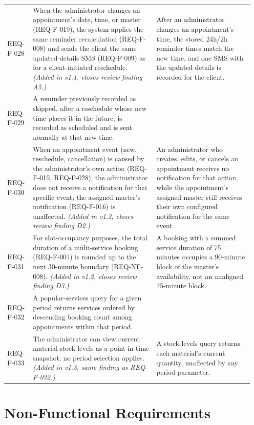 \documentclass[11pt,a4paper]{article}
\begin{document}
\begin{longtable}{L{1.9cm}L{6.4cm}L{6.2cm}}
REQ-F-028 &
When the administrator changes an appointment's date, time, or master
(REQ-F-019), the system applies the same reminder recalculation
(REQ-F-008) and sends the client the same updated-details SMS (REQ-F-009)
as for a client-initiated reschedule.
\emph{(Added in v1.1, closes review finding A5.)} &
After an administrator changes an appointment's time, the stored 24h/2h
reminder times match the new time, and one SMS with the updated details is
recorded for the client. \\

REQ-F-029 &
A reminder previously recorded as skipped, after a reschedule whose new
time places it in the future, is recorded as scheduled and is sent
normally at that new time. \\

REQ-F-030 &
When an appointment event (new, reschedule, cancellation) is caused by the
administrator's own action (REQ-F-019, REQ-F-028), the administrator does
not receive a notification for that specific event; the assigned master's
notification (REQ-F-016) is unaffected.
\emph{(Added in v1.2, closes review finding D2.)} &
An administrator who creates, edits, or cancels an appointment receives no
notification for that action, while the appointment's assigned master
still receives their own configured notification for the same event.  \\

REQ-F-031 &
For slot-occupancy purposes, the total duration of a multi-service booking
(REQ-F-001) is rounded up to the next 30-minute boundary (REQ-NF-008).
\emph{(Added in v1.2, closes review finding D3.)} &
A booking with a summed service duration of 75 minutes occupies a
90-minute block of the master's availability, not an unaligned
75-minute block. \\

REQ-F-032 &
A popular-services query for a given period returns services ordered by
descending booking count among appointments within that period. \\

REQ-F-033 &
The administrator can view current material stock levels as a point-in-time
snapshot; no period selection applies.
\emph{(Added in v1.3, same finding as REQ-F-032.)} &
A stock-levels query returns each material's current quantity, unaffected
by any period parameter.  \\

\bottomrule
\end{longtable}

\section{Non-Functional Requirements}
\label{sec:nonfunctional}
\end{document}
